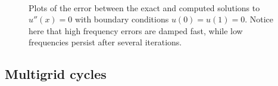 \begin{figure}
	\centering
	\\
	\caption{Plots of the error between the exact and computed solutions to $u''(x)=0$ with boundary conditions $u(0)=u(1)=0$.
			 Notice here that high frequency errors are damped fast, while low frequencies persist after several iterations.}
\end{figure}



\subsection{Multigrid cycles}

